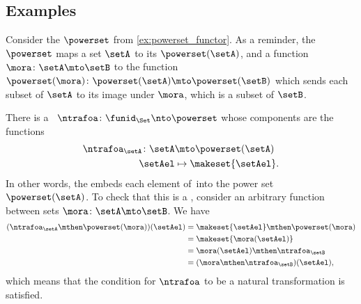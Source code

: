 \begin{figure*}[h]
    \centering
    \begin{ctdefinitionshade}
        \small
    \end{ctdefinitionshade}
    \caption{}
    \label{fig:nat_trans_graphically}
\end{figure*}


\subsection{Examples}

\begin{example}
    Consider the   $\powerset$ from \cref{ex:powerset_functor}.
    As a reminder, the   $\powerset$ maps a set $\setA$ to its  $\powerset(\setA)$, and a function $\mora \colon \setA \mto \setB$ to the function $\powerset(\mora) \colon \powerset(\setA) \mto \powerset(\setB)$ which sends each subset of $\setA$ to its image under $\mora$, which is a subset of $\setB$.
    
    There is a ~$\ntrafoa\colon \funid_\Set \nto \powerset$ whose components are the functions
    \begin{equation}
        \begin{aligned}
            \ntrafoa_\setA\colon \setA & \mto \powerset(\setA) \\
            \setAel                                         & \mapsto \makeset{\setAel}.
        \end{aligned}
    \end{equation}
    In other words, the  embeds each element of~\setA into the power set~$\powerset(\setA)$.
    To check that this is a , consider an arbitrary function between sets $\mora\colon \setA\mto \setB$.
    We have
    \begin{equation}
        \begin{aligned}
            (\ntrafoa_\setA \mthen \powerset(\mora))(\setAel)
             & =\makeset{\setAel} \mthen \powerset(\mora) \\
             & =\makeset{\mora(\setAel)} \\
             & =\mora(\setAel)\mthen \ntrafoa_\setB \\
             & =(\mora \mthen \ntrafoa_\setB)(\setAel),
        \end{aligned}
    \end{equation}
    which means that the condition for $\ntrafoa$ to be a natural transformation is satisfied. 
\end{example}


